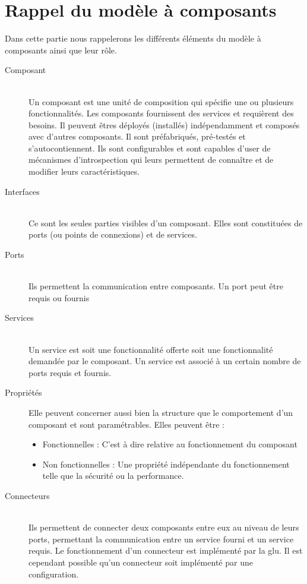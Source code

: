 \section{Rappel du modèle à composants}
Dans cette partie nous rappelerons les différents éléments du modèle à composants ainsi que leur rôle.

\begin{description}
\item[Composant] \hfill \\
  Un composant est une unité de composition qui spécifie  une ou plusieurs fonctionnalités. Les composants fournissent des services et requièrent des besoins. Il peuvent êtres déployés (installés) indépendamment et composés avec d'autres composants.
  Il sont préfabriqués, pré-testés et s'autocontiennent. Ils sont configurables et sont capables d'user de mécanismes d'introspection qui leurs permettent de connaître et de modifier leurs caractéristiques.
\item[Interfaces] \hfill \\
  Ce sont les seules parties visibles d'un composant. Elles sont constituées de ports (ou points de connexions) et de services.
\item[Ports]\hfill \\
  Ils permettent la communication entre composants. Un port peut être requis ou fournis  
\item[Services] \hfill \\ Un service est soit une fonctionnalité offerte soit une fonctionnalité demandée  par le composant. Un service est associé à un certain nombre de ports requis et fournis.
\item[Propriétés]  Elle peuvent concerner aussi bien la structure que le comportement d'un composant et sont paramétrables. Elles peuvent être :
  \begin{itemize}
  \item 
    Fonctionnelles : C'est à dire relative au fonctionnement du composant
  \item 
    Non fonctionnelles : Une propriété indépendante du fonctionnement telle que la sécurité ou la performance.
  \end{itemize}
\item[Connecteurs] \hfill \\
	Ils permettent de connecter deux composants entre eux au niveau de leurs ports, permettant la communication entre un service fourni et un service requis. Le fonctionnement d'un connecteur est implémenté par la glu. Il est cependant possible qu'un connecteur soit implémenté par une configuration.

\end{description}
